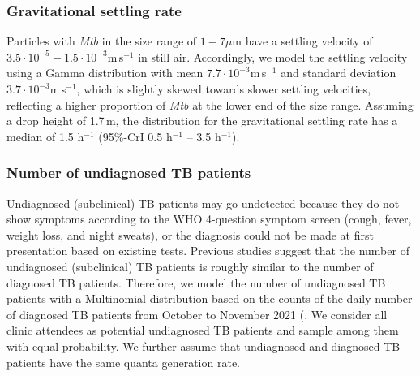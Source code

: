 \documentclass[fleqn,11pt]{wlscirep_supp}
\begin{document}
\subsubsection{Gravitational settling rate}

Particles with \emph{Mtb} in the size range of $1-7\mu$m\cite{Fennelly2020Lancet} have a settling velocity of $3.5\cdot 10^{-5}-1.5\cdot 10^{-3}$m\,s$^{-1}$ in still air\cite{Vuorinen2020SafSci}. Accordingly, we model the settling velocity using a Gamma distribution with mean $7.7\cdot 10^{-3}$m\,s$^{-1}$ and standard deviation $3.7\cdot 10^{-3}$m\,s$^{-1}$, which is slightly skewed towards slower settling velocities, reflecting a higher proportion of \emph{Mtb} at the lower end of the size range\cite{Fennelly2020Lancet}. Assuming a drop height of 1.7\,m, the distribution for the gravitational settling rate has a median of 1.5 h$^{-1}$ (95\%-CrI 0.5 h$^{-1}$ – 3.5 h$^{-1}$).

\subsubsection{Number of undiagnosed TB patients}

Undiagnosed (subclinical) TB patients may go undetected because they do not show symptoms according to the WHO 4-question symptom screen (cough, fever, weight loss, and night sweats)\cite{Berhanu2023CID}, or the diagnosis could not be made at first presentation based on existing tests\cite{Patterson2024PNAS}. Previous studies suggest that the number of undiagnosed (subclinical) TB patients is roughly similar to the number of diagnosed TB patients\cite{Berhanu2023CID,Moyo2022LancetID}. Therefore, we model the number of undiagnosed TB patients with a Multinomial distribution based on the counts of the daily number of diagnosed TB patients from October to November 2021 (. We consider all clinic attendees as potential undiagnosed TB patients and sample among them with equal probability. We further assume that undiagnosed and diagnosed TB patients have the same quanta generation rate.
\end{document}
